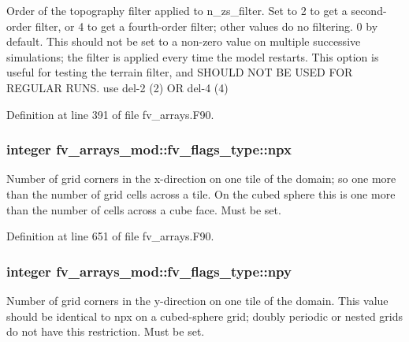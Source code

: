 Order of the topography filter applied to n\-\_\-zs\-\_\-filter. Set to 2 to get a second-\/order filter, or 4 to get a fourth-\/order filter; other values do no filtering. 0 by default. This should not be set to a non-\/zero value on multiple successive simulations; the filter is applied every time the model restarts. This option is useful for testing the terrain filter, and S\-H\-O\-U\-L\-D N\-O\-T B\-E U\-S\-E\-D F\-O\-R R\-E\-G\-U\-L\-A\-R R\-U\-N\-S. use del-\/2 (2) O\-R del-\/4 (4) 



Definition at line 391 of file fv\-\_\-arrays.\-F90.

\subsubsection[{npx}]{\setlength{\rightskip}{0pt plus 5cm}integer fv\-\_\-arrays\-\_\-mod\-::fv\-\_\-flags\-\_\-type\-::npx}\label{structfv__arrays__mod_1_1fv__flags__type_aaa16c08170125d003288233052c8afb1}


Number of grid corners in the x-\/direction on one tile of the domain; so one more than the number of grid cells across a tile. On the cubed sphere this is one more than the number of cells across a cube face. Must be set. 



Definition at line 651 of file fv\-\_\-arrays.\-F90.

\subsubsection[{npy}]{\setlength{\rightskip}{0pt plus 5cm}integer fv\-\_\-arrays\-\_\-mod\-::fv\-\_\-flags\-\_\-type\-::npy}\label{structfv__arrays__mod_1_1fv__flags__type_a98afcbae0a03aa53ad61562cb671b12e}


Number of grid corners in the y-\/direction on one tile of the domain. This value should be identical to npx on a cubed-\/sphere grid; doubly periodic or nested grids do not have this restriction. Must be set. 



